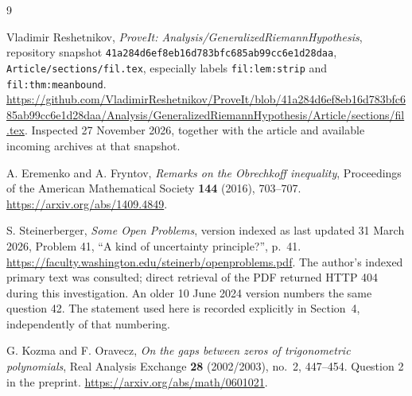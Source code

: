 \documentclass[11pt]{article}
\theoremstyle{remark}\newtheorem{remark}[theorem]{Remark}
\begin{document}
\begin{thebibliography}{9}

Vladimir Reshetnikov, \emph{ProveIt: Analysis/GeneralizedRiemannHypothesis},
repository snapshot \texttt{41a284d6ef8eb16d783bfc685ab99cc6e1d28daa},
\texttt{Article/sections/fil.tex}, especially labels
\texttt{fil:lem:strip} and \texttt{fil:thm:meanbound}.
\url{https://github.com/VladimirReshetnikov/ProveIt/blob/41a284d6ef8eb16d783bfc685ab99cc6e1d28daa/Analysis/GeneralizedRiemannHypothesis/Article/sections/fil.tex}.
Inspected 27 November 2026, together with the article and available incoming
archives at that snapshot.

A. Eremenko and A. Fryntov, \emph{Remarks on the Obrechkoff inequality},
Proceedings of the American Mathematical Society \textbf{144} (2016), 703--707.
\url{https://arxiv.org/abs/1409.4849}.

S. Steinerberger, \emph{Some Open Problems}, version indexed as last updated
31 March 2026, Problem 41, ``A kind of uncertainty principle?'', p.~41.
\url{https://faculty.washington.edu/steinerb/openproblems.pdf}.
The author's indexed primary text was consulted; direct retrieval of the PDF
returned HTTP 404 during this investigation. An older 10 June 2024 version
numbers the same question 42. The statement used here is recorded explicitly
in Section~4, independently of that numbering.

G. Kozma and F. Oravecz, \emph{On the gaps between zeros of trigonometric
polynomials}, Real Analysis Exchange \textbf{28} (2002/2003), no.~2, 447--454.
Question 2 in the preprint.
\url{https://arxiv.org/abs/math/0601021}.

\end{thebibliography}
\end{document}
